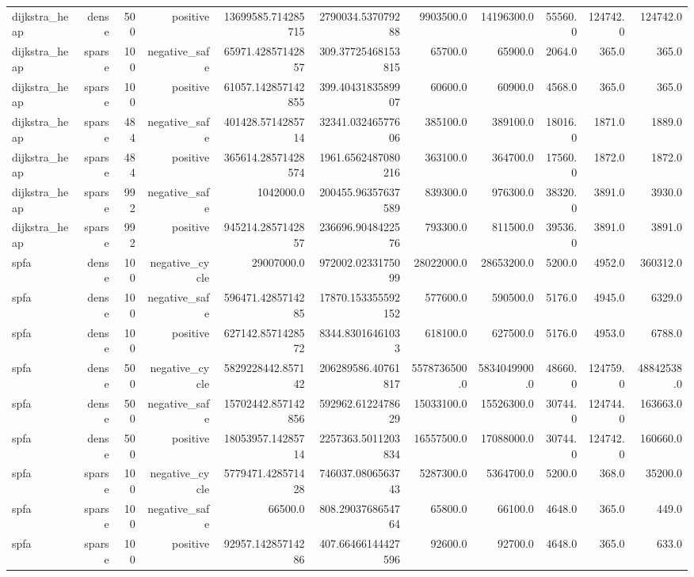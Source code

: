 \begin{table}[htbp]
\begin{tabular}{lrrrrrrrrrr}
dijkstra_heap & dense & 500 & positive & 13699585.714285715 & 2790034.537079288 & 9903500.0 & 14196300.0 & 55560.0 & 124742.0 & 124742.0 \\
dijkstra_heap & sparse & 100 & negative_safe & 65971.42857142857 & 309.37725468153815 & 65700.0 & 65900.0 & 2064.0 & 365.0 & 365.0 \\
dijkstra_heap & sparse & 100 & positive & 61057.142857142855 & 399.4043183589907 & 60600.0 & 60900.0 & 4568.0 & 365.0 & 365.0 \\
dijkstra_heap & sparse & 484 & negative_safe & 401428.5714285714 & 32341.03246577606 & 385100.0 & 389100.0 & 18016.0 & 1871.0 & 1889.0 \\
dijkstra_heap & sparse & 484 & positive & 365614.28571428574 & 1961.6562487080216 & 363100.0 & 364700.0 & 17560.0 & 1872.0 & 1872.0 \\
dijkstra_heap & sparse & 992 & negative_safe & 1042000.0 & 200455.96357637589 & 839300.0 & 976300.0 & 38320.0 & 3891.0 & 3930.0 \\
dijkstra_heap & sparse & 992 & positive & 945214.2857142857 & 236696.9048422576 & 793300.0 & 811500.0 & 39536.0 & 3891.0 & 3891.0 \\
spfa & dense & 100 & negative_cycle & 29007000.0 & 972002.0233175099 & 28022000.0 & 28653200.0 & 5200.0 & 4952.0 & 360312.0 \\
spfa & dense & 100 & negative_safe & 596471.4285714285 & 17870.153355592152 & 577600.0 & 590500.0 & 5176.0 & 4945.0 & 6329.0 \\
spfa & dense & 100 & positive & 627142.8571428572 & 8344.83016461033 & 618100.0 & 627500.0 & 5176.0 & 4953.0 & 6788.0 \\
spfa & dense & 500 & negative_cycle & 5829228442.857142 & 206289586.40761817 & 5578736500.0 & 5834049900.0 & 48660.0 & 124759.0 & 48842538.0 \\
spfa & dense & 500 & negative_safe & 15702442.857142856 & 592962.6122478629 & 15033100.0 & 15526300.0 & 30744.0 & 124744.0 & 163663.0 \\
spfa & dense & 500 & positive & 18053957.14285714 & 2257363.5011203834 & 16557500.0 & 17088000.0 & 30744.0 & 124742.0 & 160660.0 \\
spfa & sparse & 100 & negative_cycle & 5779471.428571428 & 746037.0806563743 & 5287300.0 & 5364700.0 & 5200.0 & 368.0 & 35200.0 \\
spfa & sparse & 100 & negative_safe & 66500.0 & 808.2903768654764 & 65800.0 & 66100.0 & 4648.0 & 365.0 & 449.0 \\
spfa & sparse & 100 & positive & 92957.14285714286 & 407.66466144427596 & 92600.0 & 92700.0 & 4648.0 & 365.0 & 633.0 \\

\end{tabular}
\end{table}

